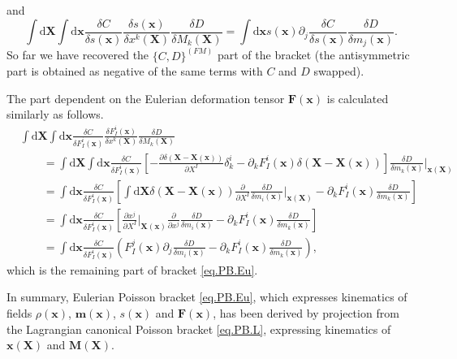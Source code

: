 \documentclass[
10pt, %
a4paper, %
oneside, %
headinclude,footinclude, %
BCOR5mm, %
]{scrartcl}
\newcommand{\xx}{\mathbf{x}}
\newcommand{\XX}{\mathbf{X}}
\newcommand{\dX}{\mathrm{d}\XX}
\newcommand{\dx}{\mathrm{d}\xx}
\newcommand{\mm}{\mathbf{m}}
\newcommand{\MM}{\mathbf{M}}
\newcommand{\FF}{\mathbf{F}}
\begin{document}
and
\begin{equation}
	\int\dX \int\dx \frac{\delta C}{\delta s(\xx)} \frac{\delta s(\xx)}{\delta x^k(\XX)} \frac{\delta D}{\delta M_k(\XX)}
	= \int\dx s(\xx)\partial_j \frac{\delta C}{\delta s(\xx)} \frac{\delta D}{\delta m_j(\xx)}.
\end{equation}
So far we have recovered the $\{C,D\}^{(FM)}$ part of the bracket (the antisymmetric part is obtained as negative of the same terms with $C$ and $D$ swapped).

The part dependent on the Eulerian deformation tensor $\FF(\xx)$ is calculated similarly as follows.
\begin{align}
	&\int\dX \int\dx \frac{\delta C}{\delta F^i_I(\xx)} \frac{\delta F^i_I(\xx)}{\delta x^k(\XX)} \frac{\delta D}{\delta M_k(\XX)}\nonumber\\
	&\qquad=\int\dX \int\dx \frac{\delta C}{\delta F^i_I(\xx)}\left[
	- \frac{\partial \delta(\XX-\XX(\xx))}{\partial X^I}\delta^i_k
	-\partial_k F^i_I(\xx)\delta(\XX-\XX(\xx))\right]\frac{\delta D}{\delta m_k(\xx)}\Big|_{\xx(\XX)}\nonumber\\
&\qquad=\int\dx  \frac{\delta C}{\delta F^i_I(\xx)}\left[
	\int\dX \delta(\XX-\XX(\xx)) \frac{\partial}{\partial X^I}\frac{\delta D}{\delta m_i(\xx)}\Big|_{\xx(\XX)}
	-\partial_k F^i_I(\xx)\frac{\delta D}{\delta m_k(\xx)}\right]\nonumber\\
&\qquad=\int\dx  \frac{\delta C}{\delta F^i_I(\xx)}\left[
	\frac{\partial x^j}{\partial X^I}\Big|_{\XX(\xx)}\frac{\partial}{\partial x^j}\frac{\delta D}{\delta m_i(\xx)}
	-\partial_k F^i_I(\xx)\frac{\delta D}{\delta m_k(\xx)}\right]\nonumber\\
&\qquad=\int\dx  \frac{\delta C}{\delta F^i_I(\xx)}\left(F^j_I(\xx)\partial_j \frac{\delta D}{\delta m_i(\xx)}
	-\partial_k F^i_I(\xx)\frac{\delta D}{\delta m_k(\xx)}\right),
\end{align}
which is the remaining part of bracket \eqref{eq.PB.Eu}. 

In summary, Eulerian Poisson bracket \eqref{eq.PB.Eu}, which expresses kinematics of fields $\rho(\xx)$, $\mm(\xx)$, $s(\xx)$ and $\FF(\xx)$, has been derived by projection from the Lagrangian canonical Poisson bracket \eqref{eq.PB.L}, expressing kinematics of $\xx(\XX)$ and $\MM(\XX)$.
\end{document}
